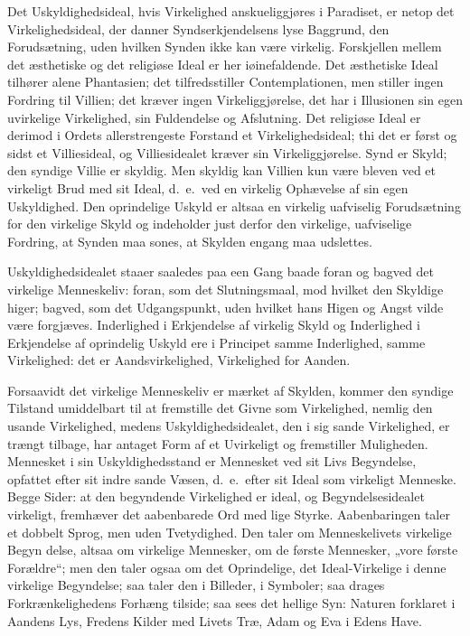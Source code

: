 \documentclass[12pt]{book}
\begin{document}
Det Uskyldighedsideal, hvis Virkelighed anskueliggjøres i Paradiset,
er netop det Virkelighedsideal, der danner Syndserkjendelsens lyse
Baggrund, den Forudsætning, uden hvilken Synden ikke kan være
virkelig. Forskjellen mellem det æsthetiske og det religiøse Ideal
er her iøinefaldende. Det æsthetiske Ideal tilhører alene
Phantasien; det tilfredsstiller Contemplationen, men stiller
ingen Fordring til Villien; det kræver ingen Virkeliggjørelse, det
har i Illusionen sin egen uvirkelige Virkelighed, sin Fuldendelse og
Afslutning. Det religiøse Ideal er derimod i Ordets allerstrengeste
Forstand et Virkelighedsideal; thi det er først og sidst et
Villiesideal, og Villiesidealet kræver sin Virkeliggjørelse. Synd er
Skyld; den syndige Villie er skyldig. Men skyldig kan Villien kun
være bleven ved et virkeligt Brud med sit Ideal, d.\ e.\ ved en
virkelig Ophævelse af sin egen Uskyldighed. Den oprindelige Uskyld
er altsaa en virkelig uafviselig Forudsætning for den virkelige
Skyld og indeholder just derfor den virkelige, uafviselige Fordring,
at Synden maa sones, at Skylden engang maa udslettes.

Uskyldighedsidealet staaer saaledes paa een Gang baade foran og
bagved det virkelige Menneskeliv: foran, som det Slutningsmaal, mod
hvilket den Skyldige higer; bagved, som det Udgangspunkt, uden
hvilket hans Higen og Angst vilde være forgjæves. Inderlighed i
Erkjendelse af virkelig Skyld og Inderlighed i Erkjendelse af
oprindelig Uskyld ere i Principet samme Inderlighed, samme
Virkelighed: det er Aandsvirkelighed, Virkelighed for Aanden.

Forsaavidt det virkelige Menneskeliv er mærket af Skylden, kommer
den syndige Tilstand umiddelbart til at fremstille det Givne som
Virkelighed, nemlig den usande Virkelighed, medens
Uskyldighedsidealet, den i sig sande Virkelighed, er trængt tilbage,
har antaget Form af et Uvirkeligt og fremstiller Muligheden.
Mennesket i sin Uskyldighedsstand er Mennesket ved sit Livs
Begyndelse, opfattet efter sit indre sande Væsen, d.\ e.\ efter sit
Ideal som virkeligt Menneske. Begge Sider: at den begyndende
Virkelighed er ideal, og Begyndelsesidealet virkeligt, fremhæver det
aabenbarede Ord med lige Styrke. Aabenbaringen taler et dobbelt
Sprog, men uden Tvetydighed. Den taler om Menneskelivets virkelige
Begyn\-
delse, altsaa om virkelige Mennesker, om de første Mennesker, „vore
første Forældre“; men den taler ogsaa om det Oprindelige, det
Ideal-Virkelige i denne virkelige Begyndelse; saa taler den i
Billeder, i Symboler; saa drages Forkrænkelighedens Forhæng tilside;
saa sees det hellige Syn: Naturen forklaret i Aandens Lys, Fredens
Kilder med Livets Træ, Adam og Eva i Edens Have.
\end{document}
